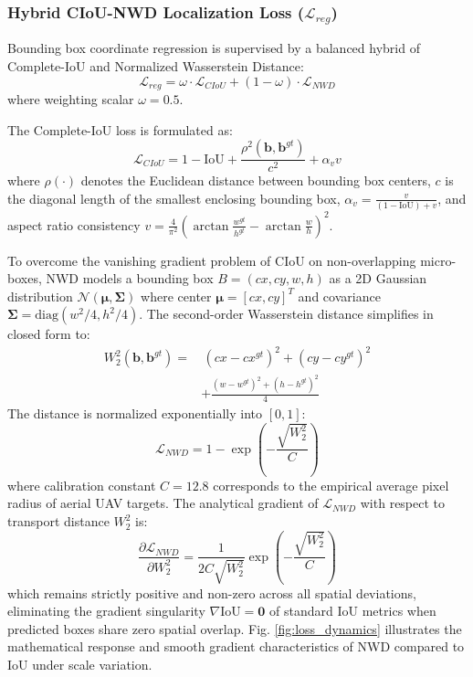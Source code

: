 \documentclass[conference]{IEEEtran}
\begin{document}
\subsubsection{Hybrid CIoU-NWD Localization Loss ($\mathcal{L}_{reg}$)}
Bounding box coordinate regression is supervised by a balanced hybrid of Complete-IoU and Normalized Wasserstein Distance:
\begin{equation}
\mathcal{L}_{reg} = \omega \cdot \mathcal{L}_{CIoU} + (1 - \omega) \cdot \mathcal{L}_{NWD}
\end{equation}
where weighting scalar $\omega = 0.5$.

The Complete-IoU loss is formulated as:
\begin{equation}
\mathcal{L}_{CIoU} = 1 - \text{IoU} + \frac{\rho^2(\mathbf{b}, \mathbf{b}^{gt})}{c^2} + \alpha_{v} v
\end{equation}
where $\rho(\cdot)$ denotes the Euclidean distance between bounding box centers, $c$ is the diagonal length of the smallest enclosing bounding box, $\alpha_v = \frac{v}{(1 - \text{IoU}) + v}$, and aspect ratio consistency $v = \frac{4}{\pi^2} (\arctan\frac{w^{gt}}{h^{gt}} - \arctan\frac{w}{h})^2$.

To overcome the vanishing gradient problem of CIoU on non-overlapping micro-boxes, NWD models a bounding box $B = (cx, cy, w, h)$ as a 2D Gaussian distribution $\mathcal{N}(\boldsymbol{\mu}, \mathbf{\Sigma})$ where center $\boldsymbol{\mu} = [cx, cy]^T$ and covariance $\mathbf{\Sigma} = \text{diag}(w^2/4, h^2/4)$. The second-order Wasserstein distance simplifies in closed form to:
\begin{equation}
\begin{aligned}
W_2^2(\mathbf{b}, \mathbf{b}^{gt}) = & \, (cx - cx^{gt})^2 + (cy - cy^{gt})^2 \\
& + \frac{(w - w^{gt})^2 + (h - h^{gt})^2}{4}
\end{aligned}
\end{equation}
The distance is normalized exponentially into $[0, 1]$:
\begin{equation}
\mathcal{L}_{NWD} = 1 - \exp\left( - \frac{\sqrt{W_2^2}}{C} \right)
\end{equation}
where calibration constant $C = 12.8$ corresponds to the empirical average pixel radius of aerial UAV targets. The analytical gradient of $\mathcal{L}_{NWD}$ with respect to transport distance $W_2^2$ is:
\begin{equation}
\frac{\partial \mathcal{L}_{NWD}}{\partial W_2^2} = \frac{1}{2C \sqrt{W_2^2}} \exp\left( - \frac{\sqrt{W_2^2}}{C} \right)
\end{equation}
which remains strictly positive and non-zero across all spatial deviations, eliminating the gradient singularity $\nabla \text{IoU} = \mathbf{0}$ of standard IoU metrics when predicted boxes share zero spatial overlap. Fig. \ref{fig:loss_dynamics} illustrates the mathematical response and smooth gradient characteristics of NWD compared to IoU under scale variation.
\end{document}
